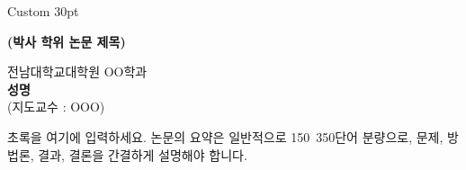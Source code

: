 {\fontsize{30pt}{36pt}\selectfont Custom 30pt}

\newpage	
\cleardoublepage
{}
{}
\vspace*{0cm}
\begin{center}
{\LARGE\bfseries (박사 학위 논문 제목) \par}    
{\large	전남대학교대학원 OO학과}\\[1\baselineskip]
{\Large {\bfseries 성명 }\\[1\baselineskip] (지도교수 : OOO)}\\[3\baselineskip]
\end{center}

{\Large {}\par}
초록을 여기에 입력하세요. 논문의 요약은 일반적으로 150~350단어 분량으로, 문제, 방법론, 결과, 결론을 간결하게 설명해야 합니다.